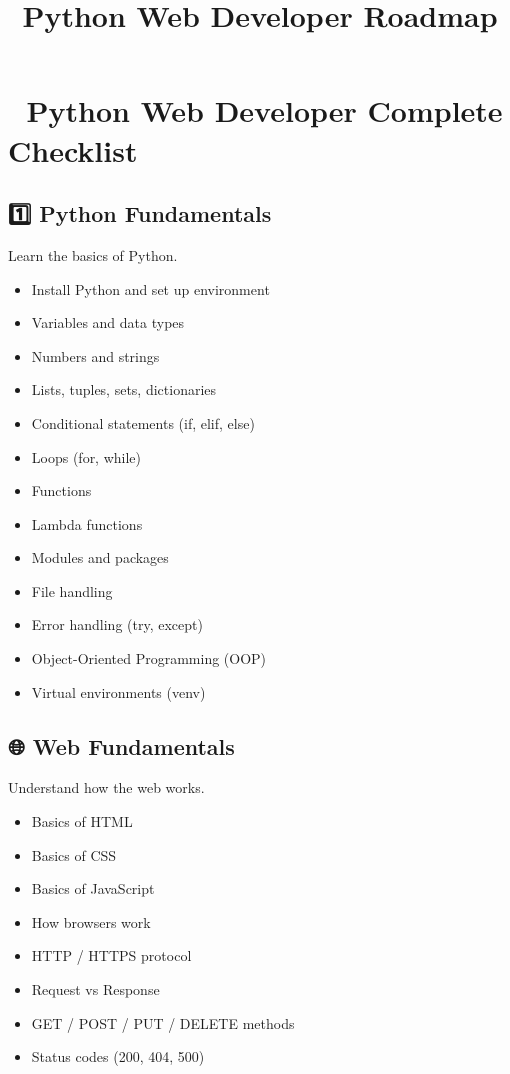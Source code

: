 \documentclass{article}
\title{Python Web Developer Roadmap}
\author{}
\date{}
\begin{document}
\maketitle

\section*{🐍 Python Web Developer Complete Checklist}

\subsection*{1️⃣ Python Fundamentals}
Learn the basics of Python.

\begin{itemize}[label=$\square$]
    \item Install Python and set up environment
    \item Variables and data types
    \item Numbers and strings
    \item Lists, tuples, sets, dictionaries
    \item Conditional statements (if, elif, else)
    \item Loops (for, while)
    \item Functions
    \item Lambda functions
    \item Modules and packages
    \item File handling
    \item Error handling (try, except)
    \item Object-Oriented Programming (OOP)
    \item Virtual environments (venv)
\end{itemize}

\subsection*{🌐 Web Fundamentals}
Understand how the web works.

\begin{itemize}[label=$\square$]
    \item Basics of HTML
    \item Basics of CSS
    \item Basics of JavaScript
    \item How browsers work
    \item HTTP / HTTPS protocol
    \item Request vs Response
    \item GET / POST / PUT / DELETE methods
    \item Status codes (200, 404, 500)
\end{itemize}
\end{document}
